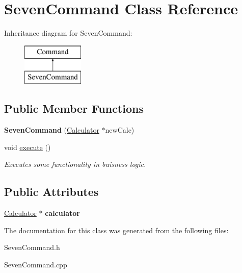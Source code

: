 \hypertarget{class_seven_command}{}\section{Seven\+Command Class Reference}
\label{class_seven_command}
Inheritance diagram for Seven\+Command\+:\begin{figure}[H]
\begin{center}
\leavevmode
\includegraphics[height=2.000000cm]{class_seven_command}
\end{center}
\end{figure}
\subsection*{Public Member Functions}
\begin{DoxyCompactItemize}
\item 
\hypertarget{class_seven_command_a0b3849d60dc9d685e42bc9791a28a1cd}{}{\bfseries Seven\+Command} (\hyperlink{class_calculator}{Calculator} $\ast$new\+Calc)\label{class_seven_command_a0b3849d60dc9d685e42bc9791a28a1cd}

\item 
\hypertarget{class_seven_command_a89ebb0bc60979b8b6d5dc65cc195f38f}{}void \hyperlink{class_seven_command_a89ebb0bc60979b8b6d5dc65cc195f38f}{execute} ()\label{class_seven_command_a89ebb0bc60979b8b6d5dc65cc195f38f}

\begin{DoxyCompactList}\small\item\em Executes some functionality in buisness logic. \end{DoxyCompactList}\end{DoxyCompactItemize}
\subsection*{Public Attributes}
\begin{DoxyCompactItemize}
\item 
\hypertarget{class_seven_command_a5758d5e5b5981f81bd56c54c87f25b48}{}\hyperlink{class_calculator}{Calculator} $\ast$ {\bfseries calculator}\label{class_seven_command_a5758d5e5b5981f81bd56c54c87f25b48}

\end{DoxyCompactItemize}


The documentation for this class was generated from the following files\+:\begin{DoxyCompactItemize}
\item 
Seven\+Command.\+h\item 
Seven\+Command.\+cpp\end{DoxyCompactItemize}
